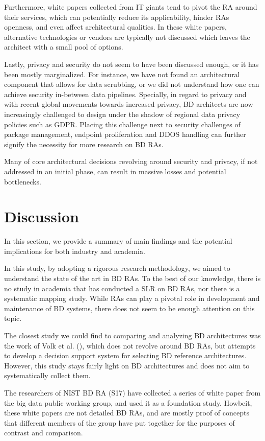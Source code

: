 \documentclass{ieeeaccess}
\begin{document}
Furthermore, white papers collected from IT giants tend to pivot the RA around their services, which can potentially reduce its applicability, hinder RAs openness, and even affect architectural qualities. In these white papers, alternative technologies or vendors are typically not discussed which leaves the architect with a small pool of options.

Lastly, privacy and security do not seem to have been discussed enough, or it has been mostly marginalized. For instance, we have not found an architectural component that allows for data scrubbing, or we did not understand how one can achieve security in-between data pipelines. Specially, in regard to privacy and with recent global movements towards increased privacy, BD architects are now increasingly challenged to design under the shadow of regional data privacy policies such as GDPR. Placing this challenge next to security challenges of package management, endpoint proliferation and DDOS handling can further signify the necessity for more research on BD RAs.

Many of core architectural decisions revolving around security and privacy, if not addressed in an initial phase, can result in massive losses and potential bottlenecks. 

\section{Discussion}

In this section, we provide a summary of main findings and the potential implications for both industry and academia. 

In this study, by adopting a rigorous research methodology, we aimed to understand the state of the art in BD RAs. To the best of our knowledge, there is no study in academia that has conducted a SLR on BD RAs, nor there is a systematic mapping study. While RAs can play a pivotal role in development and maintenance of BD systems, there does not seem to be enough attention on this topic. 

The closest study we could find to comparing and analyzing BD architectures was the work of Volk et al. (\cite{volk2019decision}), which does not revolve around BD RAs, but attempts to develop a decision support system for selecting BD reference architectures. However, this study stays fairly light on BD architectures and does not aim to systematically collect them. 

The researchers of NIST BD RA (S17) have collected a series of white paper from the big data public working group, and used it as a foundation study. Howbeit, these white papers are not detailed BD RAs, and are mostly proof of concepts that different members of the group have put together for the purposes of contrast and comparison. 
\end{document}

